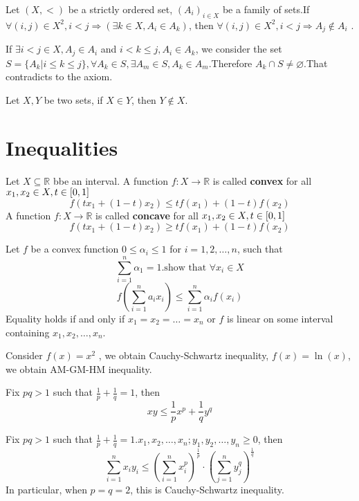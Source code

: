 \begin{propositionenv}
   Let $(X, <)$ be a strictly ordered set,  $(A_i)_{i\in X}$ be a family of sets.If $\forall (i, j)\in X^2, i<j\Rightarrow(\exists k\in X,  A_i\in A_k)$,  then $\forall (i, j)\in X^2, i<j\Rightarrow A_j\notin A_i$ .
\end{propositionenv}
\begin{proofenv}
    If $\exists i<j\in X, A_j\in A_i$ and $i<k\le j, A_i\in A_k$, we consider the set $S=\{A_k|i\le k\le j\}, \forall A_k\in S, \exists A_m\in S, A_k\in A_m$.Therefore $A_k\cap S\not=\varnothing$.That contradicts to the axiom.
\end{proofenv}
\begin{corollaryenv}
    Let $X, Y$ be two sets,  if $X\in Y$,  then $Y\notin X$.
\end{corollaryenv}


\chapter{Inequalities}
\begin{definitionenv}
    Let $X\subseteq \mathbb{R}$ bbe an interval.
    \newline 
    A function $f:X\rightarrow \mathbb{R}$ is called \textbf{convex} for all $x_1, x_2\in X, t\in \interval{0}{1}$
    $$f(tx_1+(1-t)x_2)\le tf(x_1)+(1-t)f(x_2)$$
    \newline
    A function $f:X\rightarrow \mathbb{R}$ is called \textbf{concave} for all $x_1, x_2\in X, t\in \interval{0}{1}$
    $$f(tx_1+(1-t)x_2)\ge tf(x_1)+(1-t)f(x_2)$$
\end{definitionenv}
\begin{theoremenv}
    Let $f$ be a convex function $0\le \alpha_i\le 1$ for $i=1, 2, \dots , n$, such that 
    $$\sum_{i=1}^{n}\alpha_1=1.\text{show that } \forall x_i\in X$$
    $$f\left(\sum_{i=1}^{n}a_ix_i\right)\le \sum_{i=1}^{n}\alpha_if(x_i)$$
    Equality holds if and only if $x_1=x_2=\dots =x_n$ or $f$ is linear on some interval containing $x_1, x_2, \dots, x_n$.
\end{theoremenv}
\begin{remark}
    Consider $f(x)=x^2$ , we obtain Cauchy-Schwartz inequality, $f(x)=\ln (x)$,  we obtain AM-GM-HM inequality.
\end{remark}
\begin{theoremenv}
    \quad
    \newline
    Fix $pq>1$ such that $\frac{1}{p}+\frac{1}{q}=1$, then
    $$xy\le \frac{1}{p}x^p+\frac{1}{q}y^q$$
\end{theoremenv}
\begin{theoremenv}
    \quad
    \newline
    Fix $pq>1$ such that $\frac{1}{p}+\frac{1}{q}=1$.$x_1, x_2, \dots, x_n;y_1, y_2, \dots, y_n\ge 0$, then
    $$\sum_{i=1}^{n}x_iy_i\le \left(\sum_{i=1}^{n}x_i^p\right)^{\frac{1}{p}}\cdot\left(\sum_{j=1}^{n}y_j^q\right)^{\frac{1}{q}}$$
    In particular,  when $p=q=2$,  this is Cauchy-Schwartz inequality.
\end{theoremenv}